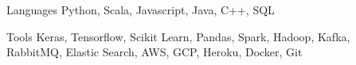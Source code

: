 


\begin{cvskills}


\cvskill
{Languages} %
{Python, Scala, Javascript, Java, C++, SQL} %


\cvskill
{Tools}
{Keras, Tensorflow, Scikit Learn, Pandas, Spark, Hadoop, Kafka, RabbitMQ, Elastic Search, AWS, GCP, Heroku, Docker, Git}




\end{cvskills}
